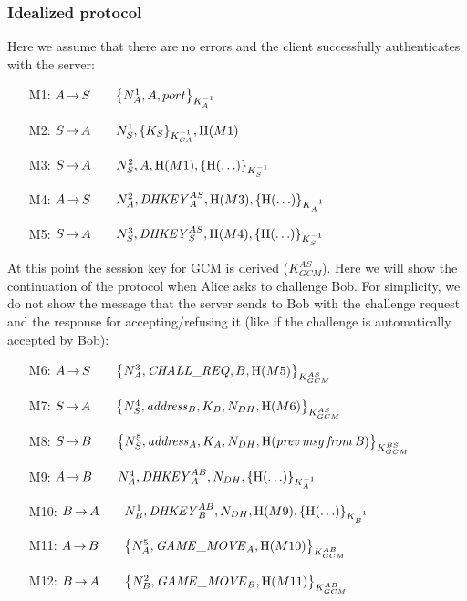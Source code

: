 \subsubsection{Idealized protocol}

Here we assume that there are no errors and the client successfully
authenticates with the server:
\begin{itemize}
	\item[M1:] \(A \operatorname{\rightarrow} S \qquad {\left\{N_A^1, A, port\right\}}_{K_A^{-1}}\)
	\item[M2:] \(S \operatorname{\rightarrow} A \qquad N_S^1, {\left\{K_S\right\}}_{K_{CA}^{-1}}, \operatorname{H}(M1)\)
	\item[M3:] \(S \operatorname{\rightarrow} A \qquad N_S^2, A, \operatorname{H}(M1), {\left\{\operatorname{H}(\ldots)\right\}}_{K_S^{-1}}\)
	\item[M4:] \(A \operatorname{\rightarrow} S \qquad N_A^2, \mathit{DHKEY}_A^{AS}, \operatorname{H}(M3), {\left\{\operatorname{H}(\ldots)\right\}}_{K_A^{-1}}\)
	\item[M5:] \(S \operatorname{\rightarrow} A \qquad N_S^3, \mathit{DHKEY}_S^{AS}, \operatorname{H}(M4), {\left\{\operatorname{H}(\ldots)\right\}}_{K_S^{-1}}\)
\end{itemize}

At this point the session key for GCM is derived (\(K_{GCM}^{AS}\)). Here we will
show the continuation of the protocol when Alice asks to challenge Bob. For
simplicity, we do not show the message that the server sends to Bob with the
challenge request and the response for accepting/refusing it (like if the
challenge is automatically accepted by Bob):
\begin{itemize}
	\item[M6:] \(A \operatorname{\rightarrow} S \qquad {\left\{N_A^3, \mathit{CHALL\_REQ}, B, \operatorname{H}(M5)\right\}}_{K_{GCM}^{AS}}\)
	\item[M7:] \(S \operatorname{\rightarrow} A \qquad {\left\{N_S^4, \mathit{address}_B, K_B, N_{DH}, \operatorname{H}(M6)\right\}}_{K_{GCM}^{AS}}\)
	\item[M8:] \(S \operatorname{\rightarrow} B \qquad {\left\{N_S^5, \mathit{address}_A, K_A, N_{DH}, \operatorname{H}(\mathit{prev\,msg\,from\,B})\right\}}_{K_{GCM}^{BS}}\)
	\item[M9:] \(A \operatorname{\rightarrow} B \qquad N_A^4, \mathit{DHKEY}_A^{AB}, N_{DH}, {\left\{\operatorname{H}(\ldots)\right\}}_{K_A^{-1}}\)
	\item[M10:] \(B \operatorname{\rightarrow} A \qquad N_B^1, \mathit{DHKEY}_B^{AB}, N_{DH}, \operatorname{H}(M9), {\left\{\operatorname{H}(\ldots)\right\}}_{K_B^{-1}}\)
	\item[M11:] \(A \operatorname{\rightarrow} B \qquad {\left\{N_A^5, \mathit{GAME\_MOVE}_A, \operatorname{H}(M10)\right\}}_{K_{GCM}^{AB}}\)
	\item[M12:] \(B \operatorname{\rightarrow} A \qquad {\left\{N_B^2, \mathit{GAME\_MOVE}_B, \operatorname{H}(M11)\right\}}_{K_{GCM}^{AB}}\)
\end{itemize}

